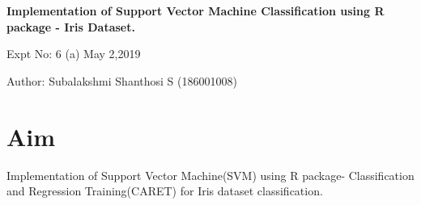 \documentclass[a4paper,10pt]{article}
\begin{document}
\setcounter{secnumdepth}{-1} 
\begin{center}
\textbf{\LARGE  Implementation of Support Vector Machine Classification using R package - Iris Dataset.}
\end{center}

\raggedright Expt No: 6 (a) \hfill \raggedleft May 2,2019 \\ 

\raggedright Author: Subalakshmi Shanthosi S (186001008) \par 

\noindent\makebox[\linewidth]{\rule{\textwidth}{1pt}} 

\section{Aim}
Implementation of Support Vector Machine(SVM) using R package- Classification and Regression Training(CARET) for Iris dataset classification.
\end{document}
